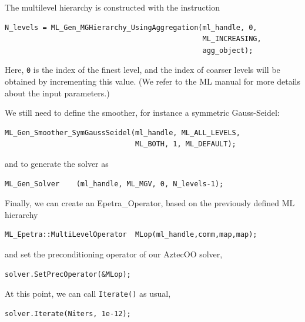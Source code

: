 The multilevel hierarchy is constructed with the instruction
\begin{verbatim}
N_levels = ML_Gen_MGHierarchy_UsingAggregation(ml_handle, 0,
                                               ML_INCREASING,
                                               agg_object);
\end{verbatim}
Here, \verb!0! is the index of the finest level, and the index of
coarser levels will be obtained by incrementing this value.  (We refer
to the ML manual for more details about the input parameters.)

We still need to define the smoother, for instance a symmetric Gauss-Seidel:
\begin{verbatim}
ML_Gen_Smoother_SymGaussSeidel(ml_handle, ML_ALL_LEVELS,
                               ML_BOTH, 1, ML_DEFAULT);
\end{verbatim}
and to generate the solver as
\begin{verbatim}
ML_Gen_Solver    (ml_handle, ML_MGV, 0, N_levels-1);
\end{verbatim}

Finally, we can create an Epetra\_Operator, based on the previously
defined ML hierarchy
\begin{verbatim}
ML_Epetra::MultiLevelOperator  MLop(ml_handle,comm,map,map);
\end{verbatim}
and set the preconditioning operator of our AztecOO solver,
\begin{verbatim}
solver.SetPrecOperator(&MLop);
\end{verbatim}
 
At this point, we can call \verb!Iterate()! as usual,
\begin{verbatim}
solver.Iterate(Niters, 1e-12);
\end{verbatim}

